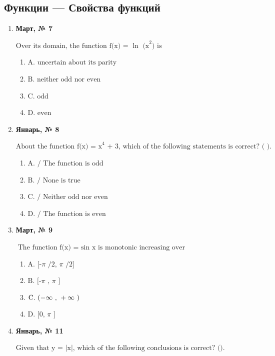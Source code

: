 \subsection*{Функции — Свойства функций}
\begin{enumerate}
\item \textbf{Март, № 7} \par \smallskip
$\displaystyle \text{Over its domain, the function f(x) = }\ln\text{ (x}^{2}\text{) is}$
\begin{enumerate}
\item $\displaystyle \text{A. uncertain about its parity}$
\item $\displaystyle \text{B. neither odd nor even}$
\item $\displaystyle \text{C. odd}$
\item $\displaystyle \text{D. even}$
\end{enumerate}
\item \textbf{Январь, № 8} \par \smallskip
$\displaystyle \text{About the function f(x) = x}^{4}\text{ + 3, which of the following statements is correct? ( ).}$
\begin{enumerate}
\item $\displaystyle \text{A.  / The function is odd}$
\item $\displaystyle \text{B.  / None is true}$
\item $\displaystyle \text{C.  / Neither odd nor even}$
\item $\displaystyle \text{D.  / The function is even}$
\end{enumerate}
\item \textbf{Март, № 9} \par \smallskip
$\displaystyle \text{The function f(x) = }\sin\text{ x is monotonic increasing over}$
\begin{enumerate}
\item $\displaystyle \text{A. [-}\pi\text{ /2, }\pi\text{ /2]}$
\item $\displaystyle \text{B. [-}\pi\text{ , }\pi\text{ ]}$
\item $\displaystyle \text{C. }(-\infty\text{ , }+\infty\text{ )}$
\item $\displaystyle \text{D. [0, }\pi\text{ ]}$
\end{enumerate}
\item \textbf{Январь, № 11} \par \smallskip
$\displaystyle \text{Given that y = |x|, which of the following conclusions is correct? ().}$

\end{enumerate}
